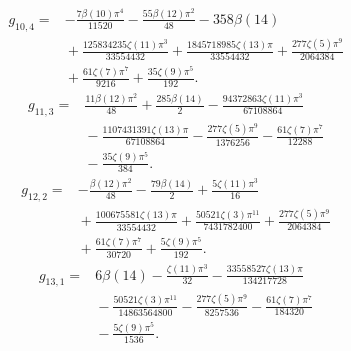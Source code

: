 \begin{align*}g_{10,4}={}&- \frac{7 \beta(10) \pi^{4}}{11520}- \frac{55 \beta(12) \pi^{2}}{48}- 358 \beta(14)\\
&{}+\frac{125834235 \zeta(11) \pi^{3}}{33554432}+\frac{1845718985 \zeta(13) \pi}{33554432}+\frac{277 \zeta(5) \pi^{9}}{2064384}\\
&{}+\frac{61 \zeta(7) \pi^{7}}{9216}+\frac{35 \zeta(9) \pi^{5}}{192}.\end{align*}
\begin{align*}g_{11,3}={}&\frac{11 \beta(12) \pi^{2}}{48}+\frac{285 \beta(14)}{2}- \frac{94372863 \zeta(11) \pi^{3}}{67108864}\\
&{}- \frac{1107431391 \zeta(13) \pi}{67108864}- \frac{277 \zeta(5) \pi^{9}}{1376256}- \frac{61 \zeta(7) \pi^{7}}{12288}\\
&{}- \frac{35 \zeta(9) \pi^{5}}{384}.\end{align*}
\begin{align*}g_{12,2}={}&- \frac{\beta(12) \pi^{2}}{48}- \frac{79 \beta(14)}{2}+\frac{5 \zeta(11) \pi^{3}}{16}\\
&{}+\frac{100675581 \zeta(13) \pi}{33554432}+\frac{50521 \zeta(3) \pi^{11}}{7431782400}+\frac{277 \zeta(5) \pi^{9}}{2064384}\\
&{}+\frac{61 \zeta(7) \pi^{7}}{30720}+\frac{5 \zeta(9) \pi^{5}}{192}.\end{align*}
\begin{align*}g_{13,1}={}&6 \beta(14)- \frac{\zeta(11) \pi^{3}}{32}- \frac{33558527 \zeta(13) \pi}{134217728}\\
&{}- \frac{50521 \zeta(3) \pi^{11}}{14863564800}- \frac{277 \zeta(5) \pi^{9}}{8257536}- \frac{61 \zeta(7) \pi^{7}}{184320}\\
&{}- \frac{5 \zeta(9) \pi^{5}}{1536}.\end{align*}
